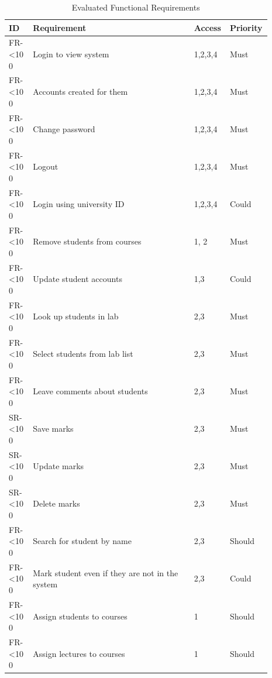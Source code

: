 \documentclass[11pt]{report}
\newcommand{\rid}[1]{\centering #1-\ifnum\value{requirement}<10 0\fi\arabic{requirement}
\stepcounter{requirement}}
\begin{document}
\begin{spacing}{1.1}
\begin{longtable}{|p{0.09\linewidth}|p{0.6\linewidth}|p{0.1\linewidth}|
p{0.1\linewidth}|}
\caption{Evaluated Functional Requirements} \label{table:eval-funct-user} \\ \hline
\textbf{ID} & \textbf{Requirement} & \textbf{Access} & \textbf{Priority}\\
\hline \hline

\rowcolor{Green} \rid{FR} &  Login to view system & 1,2,3,4 & Must\\ \hline
\rowcolor{Green} \rid{FR} &  Accounts created for them & 1,2,3,4 & Must\\ \hline
\rowcolor{Red} \rid{FR} &  Change password & 1,2,3,4 & Must\\ \hline
\rowcolor{Green} \rid{FR} &  Logout & 1,2,3,4 & Must \\ \hline
\rowcolor{Yellow} \rid{FR} &  Login using university ID & 1,2,3,4 & Could\\ \hline

\rowcolor{Green} \rid{FR} &  Remove students from courses & 1, 2 & Must\\ \hline
\rowcolor{Yellow} \rid{FR} &  Update student accounts & 1,3 & Could \\ \hline

\rowcolor{Green} \rid{FR} &  Look up students in lab & 2,3 & Must\\ \hline
\rowcolor{Green} \rid{FR} &  Select students from lab list & 2,3 & Must\\ \hline
\rowcolor{Green} \rid{FR} &  Leave comments about students & 2,3 & Must\\ \hline
\rowcolor{Green} \rid{SR} &  Save marks & 2,3 & Must\\ \hline
\rowcolor{Green} \rid{SR} &  Update marks & 2,3 & Must\\ \hline
\rowcolor{Red} \rid{SR} &  Delete marks & 2,3 & Must\\ \hline
\rowcolor{Green} \rid{FR} &  Search for student by name & 2,3 & Should\\ \hline
\rowcolor{Yellow} \rid{FR} &  Mark student even if they are not in the system & 2,3 & Could \\ \hline

\rowcolor{Green} \rid{FR} &  Assign students to courses & 1 & Should\\ \hline
\rowcolor{Green} \rid{FR} &  Assign lectures to courses & 1 & Should\\ \hline


\end{longtable}
\end{spacing}
\end{document}

